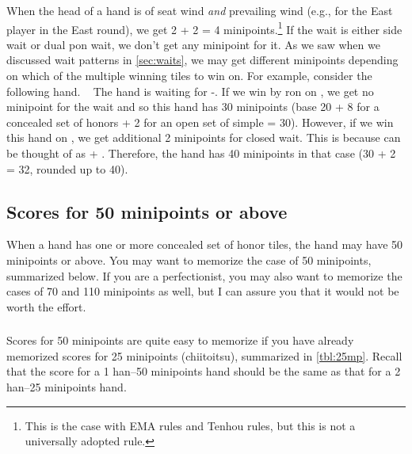 When the head of a hand is of seat wind \emph{and} prevailing wind (e.g., {\LARGE\dong} for the East player in the East round), we get 2 + 2 = 4 minipoints.\footnote{This is the case with EMA rules and {\jap Tenhou} rules, but this is not a universally adopted rule.}
If the wait is either side wait or dual {\jap pon} wait, we don't get any minipoint for it.
As we saw when we discussed wait patterns in \ref{sec:waits}, we may get different minipoints depending on which of the multiple winning tiles to win on.
For example, consider the following hand.
\bp
{}\zhong\zhong\zhong~
\ep
The hand is waiting for {\LARGE{}-}. If we win by {\jap ron} on {\LARGE{}}, we get no minipoint for the wait and so this hand has 30 minipoints (base 20 + 8 for a concealed set of honors + 2 for an open set of simple = 30). However, if we win this hand on {\LARGE{}}, we get additional 2 minipoints for closed wait. This is because {\LARGE{}} can be thought of as {\LARGE{} + }. Therefore, the hand has 40 minipoints in that case (30 + 2 = 32, rounded up to 40).

\bigskip
\subsection{Scores for 50 minipoints or above}
\bigskip
When a hand has one or more concealed set of honor tiles, the hand may have 50 minipoints or above. You may want to memorize the case of 50 minipoints, summarized below.
If you are a perfectionist, you may also want to memorize the cases of 70 and 110 minipoints as well, but I can assure you that it would not be worth the effort.

\subsubsection{}
\noindent Scores for 50 minipoints are quite easy to memorize if you have already memorized scores for 25 minipoints ({\jap chiitoitsu}), summarized in \ref{tbl:25mp}. Recall that the score for a 1 {\jap han}--50 minipoints hand should be the same as that for a 2 {\jap han}--25 minipoints hand.

